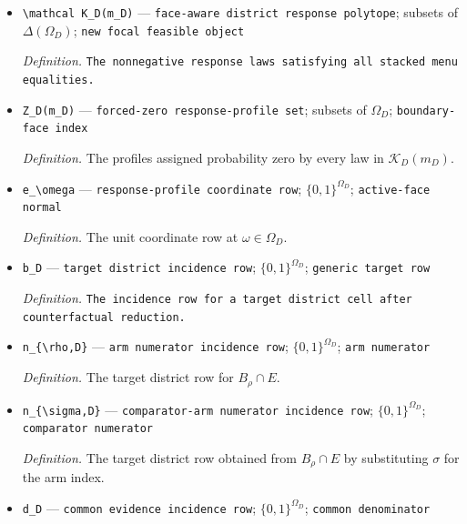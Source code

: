 \documentclass{article}
\begin{document}
\begin{itemize}
  \par\smallskip\noindent\emph{Definition.} The vector containing one followed by the exact supplied cell probabilities in the row order of \(A_D\).
  \item \texttt{\textbackslash{}\allowbreak{}mathcal K\_\allowbreak{}D(m\_\allowbreak{}D)} --- \texttt{face-\allowbreak{}aware district response polytope}; subsets of \(\Delta(\Omega_D)\); \texttt{new focal feasible object}
  \par\smallskip\noindent\emph{Definition.} \texttt{The nonnegative response laws satisfying all stacked menu equalities.}
  \item \texttt{Z\_\allowbreak{}D(m\_\allowbreak{}D)} --- \texttt{forced-\allowbreak{}zero response-\allowbreak{}profile set}; subsets of \(\Omega_D\); \texttt{boundary-\allowbreak{}face index}
  \par\smallskip\noindent\emph{Definition.} The profiles assigned probability zero by every law in \(\mathcal K_D(m_D)\).
  \item \texttt{e\_\allowbreak{}\textbackslash{}\allowbreak{}omega} --- \texttt{response-\allowbreak{}profile coordinate row}; \(\{0,1\}^{\Omega_D}\); \texttt{active-\allowbreak{}face normal}
  \par\smallskip\noindent\emph{Definition.} The unit coordinate row at \(\omega\in\Omega_D\).
  \item \texttt{b\_\allowbreak{}D} --- \texttt{target district incidence row}; \(\{0,1\}^{\Omega_D}\); \texttt{generic target row}
  \par\smallskip\noindent\emph{Definition.} \texttt{The incidence row for a target district cell after counterfactual reduction.}
  \item \texttt{n\_\allowbreak{}\{\textbackslash{}\allowbreak{}rho,\allowbreak{}D\}\allowbreak{}} --- \texttt{arm numerator incidence row}; \(\{0,1\}^{\Omega_D}\); \texttt{arm numerator}
  \par\smallskip\noindent\emph{Definition.} The target district row for \(B_\rho\cap E\).
  \item \texttt{n\_\allowbreak{}\{\textbackslash{}\allowbreak{}sigma,\allowbreak{}D\}\allowbreak{}} --- \texttt{comparator-\allowbreak{}arm numerator incidence row}; \(\{0,1\}^{\Omega_D}\); \texttt{comparator numerator}
  \par\smallskip\noindent\emph{Definition.} The target district row obtained from \(B_\rho\cap E\) by substituting \(\sigma\) for the arm index.
  \item \texttt{d\_\allowbreak{}D} --- \texttt{common evidence incidence row}; \(\{0,1\}^{\Omega_D}\); \texttt{common denominator}

\end{itemize}
\end{document}
